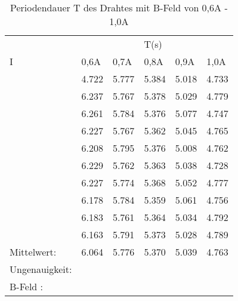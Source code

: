 \begin{table}
    \centering
    \label{tab:tabelle_1}
    \begin{tabular}{p{3cm} | p{1.5cm} p{1.5cm} p{1.5cm} p{1.5cm} p{1.5cm}}
      &      &      & T(s) &      &     \\
    I & 0,6A & 0,7A & 0,8A & 0,9A & 1,0A\\
    \midrule
    & 4.722 &  5.777 &  5.384 &  5.018 &  4.733\\
    & 6.237 &  5.767 &  5.378 &  5.029 &  4.779\\
    & 6.261 &  5.784 &  5.376 &  5.077 &  4.747\\
    & 6.227 &  5.767 &  5.362 &  5.045 &  4.765\\
    & 6.208 &  5.795 &  5.376 &  5.008 &  4.762\\
    & 6.229 &  5.762 &  5.363 &  5.038 &  4.728\\
    & 6.227 &  5.774 &  5.368 &  5.052 &  4.777\\
    & 6.178 &  5.784 &  5.359 &  5.061 &  4.756\\
    & 6.183 &  5.761 &  5.364 &  5.034 &  4.792\\
    & 6.163 &  5.791 &  5.373 &  5.028 &  4.789\\
    \midrule
    Mittelwert:    & 6.064 & 5.776 & 5.370 & 5.039 &  4.763 \\
    Ungenauigkeit: & & & & & \\
    \midrule
    B-Feld : & & & & & \\
    \bottomrule
    \end{tabular}
    \caption{Periodendauer T des Drahtes mit B-Feld von 0,6A - 1,0A}
    \label{tab:tabelle_06A}
\end{table}





\label{sec:Auswertung}
